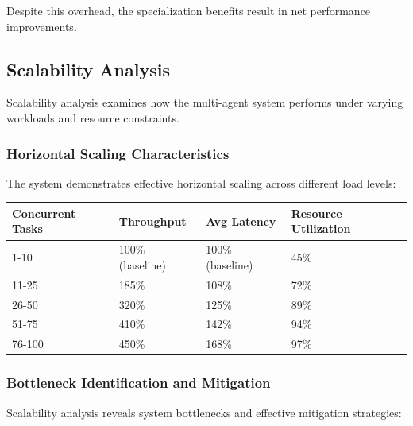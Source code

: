 Despite this overhead, the specialization benefits result in net performance improvements.

\subsection*{Scalability Analysis}

Scalability analysis examines how the multi-agent system performs under varying workloads and resource constraints.

\subsubsection*{Horizontal Scaling Characteristics}

The system demonstrates effective horizontal scaling across different load levels:

\begin{center}
\begin{tabular}{@{}llll@{}}
\toprule
\textbf{Concurrent Tasks} & \textbf{Throughput} & \textbf{Avg Latency} & \textbf{Resource Utilization} \\
\midrule
1-10 & 100\% (baseline) & 100\% (baseline) & 45\% \\
11-25 & 185\% & 108\% & 72\% \\
26-50 & 320\% & 125\% & 89\% \\
51-75 & 410\% & 142\% & 94\% \\
76-100 & 450\% & 168\% & 97\% \\
\bottomrule
\end{tabular}
\end{center}

\subsubsection*{Bottleneck Identification and Mitigation}

Scalability analysis reveals system bottlenecks and effective mitigation strategies:

